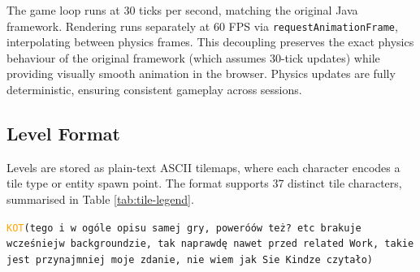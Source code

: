 \documentclass[shortabstract, mgr, english]{iithesis}
\newcommand{\DEBUG}[1]{{#1}} %
\newcommand{\KOT}[1]{\DEBUG{\tt{\textcolor{orange}{KOT}(}{#1}{)}}}
\begin{document}
The game loop runs at 30 ticks per second, matching the original Java framework.
Rendering runs separately at 60 FPS via \texttt{requestAnimationFrame}, interpolating
between physics frames. This decoupling preserves the exact physics behaviour of the
original framework (which assumes 30-tick updates) while providing visually smooth
animation in the browser. Physics updates are fully deterministic, ensuring consistent
gameplay across sessions.

\subsection{Level Format}
\label{subsec:sd-level-format}

Levels are stored as plain-text ASCII tilemaps, where each character encodes a tile type
or entity spawn point. The format supports 37 distinct tile characters, summarised in
Table \ref{tab:tile-legend}.

\KOT{tego i w ogóle opisu samej gry, poweróów też? etc brakuje wcześniejw  backgroundzie, tak naprawdę nawet przed related Work, takie jest przynajmniej moje zdanie, nie wiem jak Sie Kindze czytało}
\end{document}
